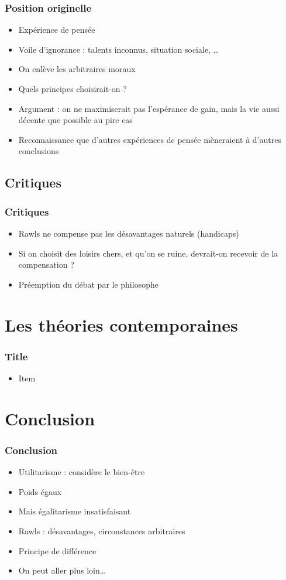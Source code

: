 \documentclass[french]{beamer}
\begin{document}
\begin{frame}
	\frametitle{Position originelle}
	\begin{itemize}
		\item Expérience de pensée
		\item Voile d’ignorance : talents inconnus, situation sociale, …
		\item On enlève les arbitraires moraux
		\item Quels principes choisirait-on ?
		\item Argument : on ne maximiserait pas l’espérance de gain, mais la vie aussi décente que possible au pire cas
		\item Reconnaissance que d’autres expériences de pensée mèneraient à d’autres conclusions
	\end{itemize}
\end{frame}

\subsection{Critiques}
\begin{frame}
	\frametitle{Critiques}
	\begin{itemize}
		\item Rawls ne compense pas les désavantages naturels (handicaps)
    \item Si on choisit des loisirs chers, et qu’on se ruine, devrait-on recevoir de la compensation ? 
    \item Préemption du débat par le philosophe \citep{estlund_democratic_2009}
	\end{itemize}
\end{frame}

\section{Les théories contemporaines}
\begin{frame}
	\frametitle{Title}
	\begin{itemize}
		\item Item
	\end{itemize}
\end{frame}

\section{Conclusion}
\begin{frame}
	\frametitle{Conclusion}
	\begin{itemize}
		\item Utilitarisme : considère le bien-être
		\item Poids égaux
		\item Mais égalitarisme insatisfaisant
		\item Rawls : désavantages, circonstances arbitraires
		\item Principe de différence
		\item On peut aller plus loin…
	\end{itemize}
\end{frame}
\end{document}
